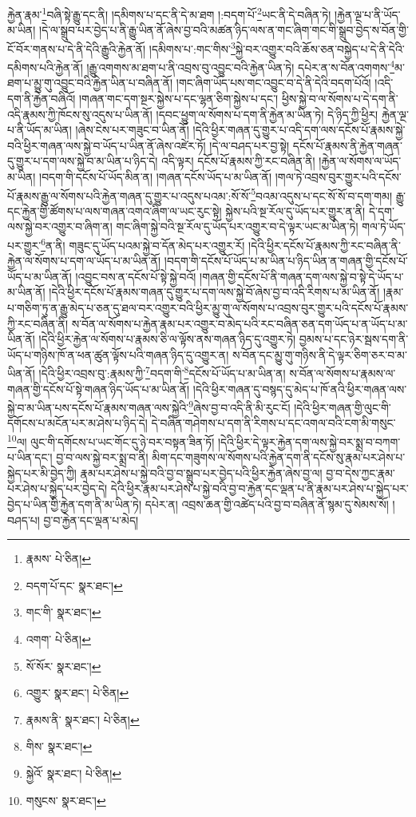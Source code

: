 རྐྱེན་རྣམ་\footnote{རྣམས་  པེ་ཅིན། }བཞི་སྟེ་རྒྱུ་དང་ནི། །དམིགས་པ་དང་ནི་དེ་མ་ཐག །:བདག་པོ་\footnote{བདག་པོ་དང་  སྣར་ཐང་། }ཡང་ནི་དེ་བཞིན་ཏེ། །རྐྱེན་ལྔ་པ་ནི་ཡོད་མ་ཡིན། །དེ་ལ་སྒྲུབ་པར་བྱེད་པ་ནི་རྒྱུ་ཡིན་ནོ་ཞེས་བྱ་བའི་མཚན་ཉིད་ལས་ན་གང་ཞིག་གང་གི་སྒྲུབ་བྱེད་ས་བོན་གྱི་ངོ་བོར་གནས་པ་དེ་ནི་དེའི་རྒྱུའི་རྐྱེན་ནོ། །དམིགས་པ་:གང་གིས་\footnote{གང་གི་  སྣར་ཐང་། }སྐྱེ་བར་འགྱུར་བའི་ཆོས་ཅན་བསྐྱེད་པ་དེ་ནི་དེའི་དམིགས་པའི་རྐྱེན་ནོ། །རྒྱུ་འགགས་མ་ཐག་པ་ནི་འབྲས་བུ་འབྱུང་བའི་རྐྱེན་ཡིན་ཏེ། དཔེར་ན་ས་བོན་འགགས་\footnote{འགག་  པེ་ཅིན། }མ་ཐག་པ་མྱུ་གུ་འབྱུང་བའི་རྐྱེན་ཡིན་པ་བཞིན་ནོ། །གང་ཞིག་ཡོད་པས་གང་འབྱུང་བ་དེ་ནི་དེའི་བདག་པོའོ། །འདི་དག་ནི་རྐྱེན་བཞིའོ། །གཞན་གང་དག་སྔར་སྐྱེས་པ་དང་ལྷན་ཅིག་སྐྱེས་པ་དང་། ཕྱིས་སྐྱེ་བ་ལ་སོགས་པ་དེ་དག་ནི་འདི་རྣམས་ཀྱི་ཁོངས་སུ་འདུས་པ་ཡིན་ནོ། །དབང་ཕྱུག་ལ་སོགས་པ་དག་ནི་རྐྱེན་མ་ཡིན་ཏེ། དེ་ཉིད་ཀྱི་ཕྱིར། རྐྱེན་ལྔ་པ་ནི་ཡོད་མ་ཡིན། །ཞེས་ངེས་པར་གཟུང་བ་ཡིན་ནོ། །དེའི་ཕྱིར་གཞན་དུ་གྱུར་པ་འདི་དག་ལས་དངོས་པོ་རྣམས་སྐྱེ་བའི་ཕྱིར་གཞན་ལས་སྐྱེ་བ་ཡོད་པ་ཡིན་ནོ་ཞེས་འཛེར་ཏོ། །དེ་ལ་བཤད་པར་བྱ་སྟེ། དངོས་པོ་རྣམས་ནི་རྐྱེན་གཞན་དུ་གྱུར་པ་དག་ལས་སྐྱེ་བ་མ་ཡིན་པ་ཉིད་དེ། འདི་ལྟར། དངོས་པོ་རྣམས་ཀྱི་རང་བཞིན་ནི། །རྐྱེན་ལ་སོགས་ལ་ཡོད་མ་ཡིན། །བདག་གི་དངོས་པོ་ཡོད་མིན་ན། །གཞན་དངོས་ཡོད་པ་མ་ཡིན་ནོ། །གལ་ཏེ་འབྲས་བུར་གྱུར་པའི་དངོས་པོ་རྣམས་རྒྱུ་ལ་སོགས་པའི་རྐྱེན་གཞན་དུ་གྱུར་པ་འདུས་པའམ་:སོ་སོ་\footnote{སོ་སོར་  སྣར་ཐང་། }བའམ་འདུས་པ་དང་སོ་སོ་བ་དག་གམ། རྒྱུ་དང་རྐྱེན་གྱི་ཚོགས་པ་ལས་གཞན་འགའ་ཞིག་ལ་ཡང་རུང་སྟེ། སྐྱེས་པའི་སྔ་རོལ་དུ་ཡོད་པར་གྱུར་ན་ནི། དེ་དག་ལས་སྐྱེ་བར་འགྱུར་བ་ཞིག་ན། གང་ཞིག་སྐྱེ་བའི་སྔ་རོལ་དུ་ཡོད་པར་འགྱུར་བ་དེ་ལྟར་ཡང་མ་ཡིན་ཏེ། གལ་ཏེ་ཡོད་པར་གྱུར་\footnote{འགྱུར་  སྣར་ཐང་།  པེ་ཅིན། }ན་ནི། གཟུང་དུ་ཡོད་པའམ་སྐྱེ་བ་དོན་མེད་པར་འགྱུར་རོ། །དེའི་ཕྱིར་དངོས་པོ་རྣམས་ཀྱི་རང་བཞིན་ནི་རྐྱེན་ལ་སོགས་པ་དག་ལ་ཡོད་པ་མ་ཡིན་ནོ། །བདག་གི་དངོས་པོ་ཡོད་པ་མ་ཡིན་པ་ཉིད་ཡིན་ན་གཞན་གྱི་དངོས་པོ་ཡོད་པ་མ་ཡིན་ནོ། །འབྱུང་བས་ན་དངོས་པོ་སྟེ་སྐྱེ་བའོ། །གཞན་གྱི་དངོས་པོ་ནི་གཞན་དག་ལས་སྐྱེ་བ་སྟེ་དེ་ཡོད་པ་མ་ཡིན་ནོ། །དེའི་ཕྱིར་དངོས་པོ་རྣམས་གཞན་དུ་གྱུར་པ་དག་ལས་སྐྱེ་བོ་ཞེས་བྱ་བ་འདི་རིགས་པ་མ་ཡིན་ནོ། །རྣམ་པ་གཅིག་ཏུ་ན་རྒྱུ་མེད་པ་ཅན་དུ་ཐལ་བར་འགྱུར་བའི་ཕྱིར་མྱུ་གུ་ལ་སོགས་པ་འབྲས་བུར་གྱུར་པའི་དངོས་པོ་རྣམས་ཀྱི་རང་བཞིན་ནི། ས་བོན་ལ་སོགས་པ་རྐྱེན་རྣམ་པར་འགྱུར་བ་མེད་པའི་རང་བཞིན་ཅན་དག་ཡོད་པ་ན་ཡོད་པ་མ་ཡིན་ནོ། །དེའི་ཕྱིར་རྐྱེན་ལ་སོགས་པ་རྣམས་ཅི་ལ་ལྟོས་ནས་གཞན་ཉིད་དུ་འགྱུར་ཏེ། བྱམས་པ་དང་ཉེར་སྦས་དག་ནི་ཡོད་པ་གཉིས་ཁོ་ན་ཕན་ཚུན་ལྟོས་པའི་གཞན་ཉིད་དུ་འགྱུར་ན། ས་བོན་དང་མྱུ་གུ་གཉིས་ནི་དེ་ལྟར་ཅིག་ཅར་བ་མ་ཡིན་ནོ། །དེའི་ཕྱིར་འབྲས་བུ་:རྣམས་ཀྱི་\footnote{རྣམས་ནི་  སྣར་ཐང་།  པེ་ཅིན། }བདག་གི་\footnote{གིས་  སྣར་ཐང་། }དངོས་པོ་ཡོད་པ་མ་ཡིན་ན། ས་བོན་ལ་སོགས་པ་རྣམས་ལ་གཞན་གྱི་དངོས་པོ་སྟེ་གཞན་ཉིད་ཡོད་པ་མ་ཡིན་ནོ། །དེའི་ཕྱིར་གཞན་དུ་བསྙད་དུ་མེད་པ་ཁོ་ནའི་ཕྱིར་གཞན་ལས་སྐྱེ་བ་མ་ཡིན་པས་དངོས་པོ་རྣམས་གཞན་ལས་སྐྱེའི་\footnote{སྐྱེའོ་  སྣར་ཐང་།  པེ་ཅིན། }ཞེས་བྱ་བ་འདི་ནི་མི་རུང་ངོ། །དེའི་ཕྱིར་གཞན་གྱི་ལུང་གི་དགོངས་པ་མངོན་པར་མ་ཤེས་པ་ཉིད་དེ། དེ་བཞིན་གཤེགས་པ་དག་ནི་རིགས་པ་དང་འགལ་བའི་ངག་མི་གསུང་\footnote{གསུངས་  སྣར་ཐང་། }ལ། ལུང་གི་དགོངས་པ་ཡང་གོང་དུ་ཉེ་བར་བསྟན་ཟིན་ཏོ། །དེའི་ཕྱིར་དེ་ལྟར་རྐྱེན་དག་ལས་སྐྱེ་བར་སྨྲ་བ་བཀག་པ་ཡིན་དང་། བྱ་བ་ལས་སྐྱེ་བར་སྨྲ་བ་ནི། མིག་དང་གཟུགས་ལ་སོགས་པའི་རྐྱེན་དག་ནི་དངོས་སུ་རྣམ་པར་ཤེས་པ་སྐྱེད་པར་མི་བྱེད་ཀྱི། རྣམ་པར་ཤེས་པ་སྐྱེ་བའི་བྱ་བ་སྒྲུབ་པར་བྱེད་པའི་ཕྱིར་རྐྱེན་ཞེས་བྱ་ལ། བྱ་བ་དེས་ཀྱང་རྣམ་པར་ཤེས་པ་སྐྱེད་པར་བྱེད་དེ། དེའི་ཕྱིར་རྣམ་པར་ཤེས་པ་སྐྱེ་བའི་བྱ་བ་རྐྱེན་དང་ལྡན་པ་ནི་རྣམ་པར་ཤེས་པ་སྐྱེད་པར་བྱེད་པ་ཡིན་གྱི་རྐྱེན་དག་ནི་མ་ཡིན་ཏེ། དཔེར་ན། འབྲས་ཆན་གྱི་འཚེད་པའི་བྱ་བ་བཞིན་ནོ་སྙམ་དུ་སེམས་སོ། །བཤད་པ། བྱ་བ་རྐྱེན་དང་ལྡན་པ་མེད། 
